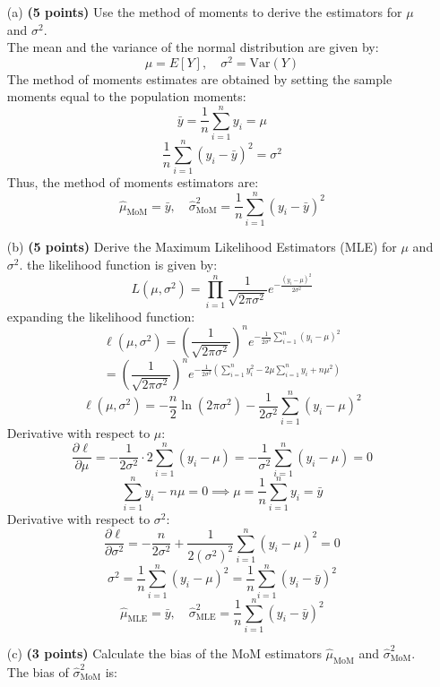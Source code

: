 \documentclass{article}
\begin{document}
\begin{enumerate}
    \item[(a)] \textbf{(5 points)} Use the method of moments to derive the estimators for \(\mu\) and \(\sigma^2\).
    \\ The mean and the variance of the normal distribution are given by:
    \[
    \mu = E[Y], \quad \sigma^2 = \text{Var}(Y)
    \]
    The method of moments estimates are obtained by setting the sample moments equal to the population moments:
    \[
    \bar{y} = \frac{1}{n} \sum_{i=1}^n y_i = \mu
    \]
    \[
    \frac{1}{n} \sum_{i=1}^n (y_i - \bar{y})^2 = \sigma^2
    \]
    Thus, the method of moments estimators are:
    \[
    \hat{\mu}_{\text{MoM}} = \bar{y}, \quad \hat{\sigma}^2_{\text{MoM}} = \frac{1}{n} \sum_{i=1}^n (y_i - \bar{y})^2
    \]
    
    
     \item[(b)] \textbf{(5 points)} Derive the Maximum Likelihood Estimators (MLE) for \(\mu\) and \(\sigma^2\).
    the likelihood function is given by:
    \[
    L(\mu, \sigma^2) = \prod_{i=1}^{n} \frac{1}{\sqrt{2\pi\sigma^2}} e^{-\frac{(y_i - \mu)^2}{2\sigma^2}}
    \]
    expanding the likelihood function:
    \[
    \ell(\mu, \sigma^2) = \left( \frac{1}{\sqrt{2\pi\sigma^2}} \right)^n e^{-\frac{1}{2\sigma^2} \sum_{i=1}^{n} (y_i - \mu)^2}
    \]
    \[
    = \left( \frac{1}{\sqrt{2\pi\sigma^2}} \right)^n e^{-\frac{1}{2\sigma^2} \left( \sum_{i=1}^{n} y_i^2 - 2\mu \sum_{i=1}^{n} y_i + n\mu^2 \right)}
    \]
    \[
    \ell(\mu, \sigma^2) = -\frac{n}{2} \ln(2\pi\sigma^2) - \frac{1}{2\sigma^2} \sum_{i=1}^n (y_i - \mu)^2
    \]
    Derivative with respect to \( \mu \):
    \[
    \frac{\partial \ell}{\partial \mu} = -\frac{1}{2\sigma^2} \cdot 2 \sum_{i=1}^n (y_i - \mu) = -\frac{1}{\sigma^2} \sum_{i=1}^n (y_i - \mu) = 0
    \]
    \[
    \sum_{i=1}^n y_i - n\mu = 0 \implies \mu = \frac{1}{n} \sum_{i=1}^n y_i = \bar{y}
    \]
    Derivative with respect to \( \sigma^2 \):
    \[
    \frac{\partial \ell}{\partial \sigma^2} = -\frac{n}{2\sigma^2} + \frac{1}{2(\sigma^2)^2} \sum_{i=1}^n (y_i - \mu)^2 = 0
    \]
    \[
    \sigma^2 = \frac{1}{n} \sum_{i=1}^n (y_i - \mu)^2 = \frac{1}{n} \sum_{i=1}^n (y_i - \bar{y})^2
    \]
    \[
    \hat{\mu}_{\text{MLE}} = \bar{y}, \quad \hat{\sigma}^2_{\text{MLE}} = \frac{1}{n} \sum_{i=1}^n (y_i - \bar{y})^2
    \]

     \item[(c)] \textbf{(3 points)} Calculate the bias of the MoM estimators \(\hat{\mu}_{\text{MoM}}\) and \(\hat{\sigma}^2_{\text{MoM}}\).
     The bias of \( \hat{\sigma}^2_{\text{MoM}} \) is:


\end{enumerate}
\end{document}
